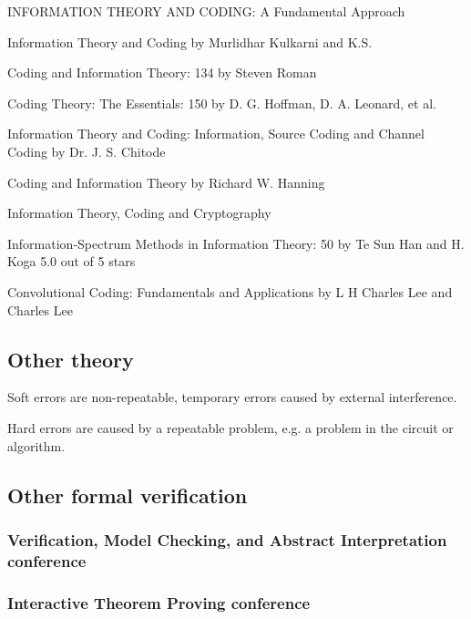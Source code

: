 \documentclass{article}
\begin{document}
INFORMATION THEORY AND CODING: A Fundamental Approach

Information Theory and Coding
by Murlidhar Kulkarni and K.S. 

Coding and Information Theory: 134
by Steven Roman

Coding Theory: The Essentials: 150
by D. G. Hoffman, D. A. Leonard, et al.

Information Theory and Coding: Information, Source Coding and Channel Coding
by Dr. J. S. Chitode

Coding and Information Theory
by Richard W. Hanning

Information Theory, Coding and Cryptography

Information-Spectrum Methods in Information Theory: 50
by Te Sun Han and H. Koga
5.0 out of 5 stars

Convolutional Coding: Fundamentals and Applications
by L H Charles Lee and Charles Lee


\subsection{Other theory}

Soft errors are non-repeatable, temporary errors caused by external interference.

Hard errors are caused by a repeatable problem, e.g. a problem in the circuit or algorithm.


\subsection{Other formal verification}

\subsubsection{Verification, Model Checking, and Abstract Interpretation conference}

\subsubsection{Interactive Theorem Proving conference}
\end{document}
